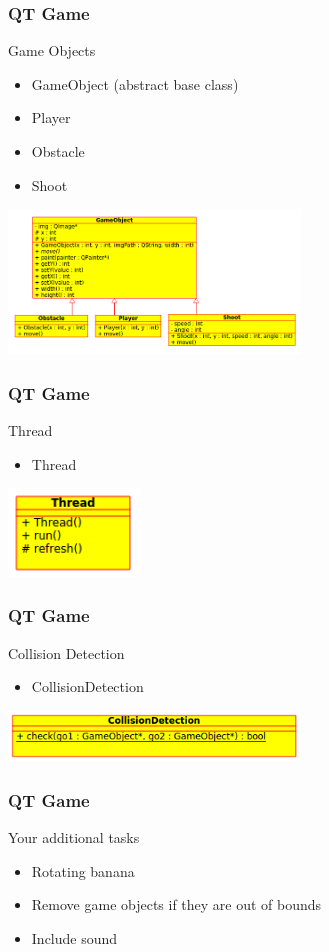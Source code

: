 \begin{frame}[fragile]
\frametitle{QT Game}
Game Objects
\begin{itemize}
\item GameObject (abstract base class)
\item Player
\item Obstacle
\item Shoot
\end{itemize}
\includegraphics[width=220pt]{img/qtgame_cdgo.png}
\end{frame}

\begin{frame}[fragile]
\frametitle{QT Game}
Thread
\begin{itemize}
\item Thread
\end{itemize}
\includegraphics[width=100pt]{img/qtgame_cdthread.png}
\end{frame}

\begin{frame}[fragile]
\frametitle{QT Game}
Collision Detection
\begin{itemize}
\item CollisionDetection
\end{itemize}
\includegraphics[width=220pt]{img/qtgame_cdcd.png}
\end{frame}

\begin{frame}[fragile]
\frametitle{QT Game}
Your additional tasks
\begin{itemize}
\item Rotating banana
\item Remove game objects if they are out of bounds
\item Include sound
\end{itemize}
\end{frame}


